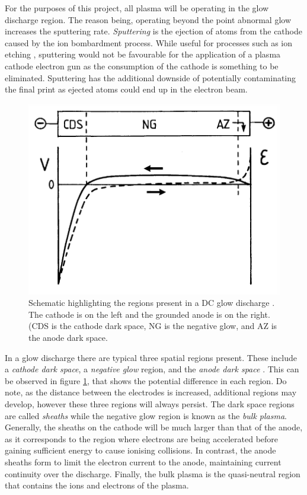 For the purposes of this project, all plasma will be operating in the glow discharge region. The reason being, operating beyond the point abnormal glow increases the sputtering rate. \textit{Sputtering} is the ejection of atoms from the cathode caused by the ion bombardment process. While useful for processes such as ion etching \cite{Lieberman2005}, sputtering would not be favourable for the application of a plasma cathode electron gun as the consumption of the cathode is something to be eliminated. Sputtering has the additional downside of potentially contaminating the final print as ejected atoms could end up in the electron beam. 

\begin{figure}[h!]
	\centering
	\includegraphics[width=0.7\linewidth]{chapter_2/figures/glow_discharge.png}
	\caption{Schematic highlighting the regions present in a DC glow discharge \cite{Bogaerts2002}. The cathode is on the left and the grounded anode is on the right. (CDS is the cathode dark space, NG is the negative glow, and AZ is the anode dark space.}
	\label{fig:glow_discharge}
\end{figure}

In a glow discharge there are typical three spatial regions present. These include a \textit{cathode dark space}, a \textit{negative glow} region, and the \textit{anode dark space} \cite{Gudmundsson2017, Bogaerts2002}. This can be observed in figure \ref{fig:glow_discharge}, that shows the potential difference in each region. Do note, as the distance between the electrodes is increased, additional regions may develop, however these three regions will always persist. The dark space regions are called \textit{sheaths} while the negative glow region is known as the \textit{bulk plasma}. Generally, the sheaths on the cathode will be much larger than that of the anode, as it corresponds to the region where electrons are being accelerated before gaining sufficient energy to cause ionising collisions. In contrast, the anode sheaths form to limit the electron current to the anode, maintaining current continuity over the discharge. Finally, the bulk plasma is the quasi-neutral region that contains the ions and electrons of the plasma.

